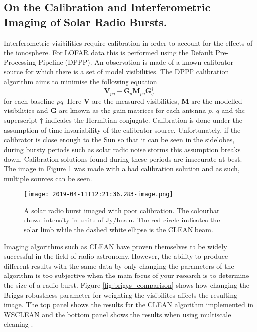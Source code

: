 \subsection{On the Calibration and Interferometric Imaging of Solar Radio Bursts.}
Interferometric visibilities require calibration in order to account for the effects of the ionosphere. For LOFAR data this is performed using the Default Pre-Processing Pipeline (DPPP). An observation is made of a known calibrator source for which there is a set of model visibilities. The DPPP calibration algorithm aims to minimise the following equation
\begin{equation}
\label{eq:gain}
\vert \vert \mathbf{V}_{pq} - \mathbf{G}_p \mathbf{M}_{pq} \mathbf{G}^\dag_q \vert \vert
\end{equation}
for each baseline $pq$. Here $\mathbf{V}$ are the measured visibilities, $\mathbf{M}$ are the modelled visibilities and $\mathbf{G}$ are known as the gain matrices for each antenna $p$, $q$ and the superscript $\dag$ indicates the Hermitian conjugate. Calibration is done under the assumption of time invariability of the calibrator source. Unfortunately, if the calibrator is close enough to the Sun so that it can be seen in the sidelobes, during bursty periods such as solar radio noise storms this assumption breaks down. Calibration solutions found during these periods are inaccurate at best. The image in Figure \ref{fig:bad_cal} was made with a bad calibration solution and as such, multiple sources can be seen.

\begin{figure}[ht]
\centering
\texttt{[image: 2019-04-11T12:21:36.283-image.png]}
\caption[An example of a solar radio burst imaged with poor calibration.]{A solar radio burst imaged with poor calibration. The colourbar shows intensity in units of Jy/beam. The red circle indicates the solar limb while the dashed white ellipse is the CLEAN beam.}
\label{fig:bad_cal}
\end{figure}

Imaging algorithms such as CLEAN have proven themselves to be widely successful in the field of radio astronomy. However, the ability to produce different results with the same data by only changing the parameters of the algorithm is too subjective when the main focus of your research is to determine the size of a radio burst. Figure \ref{fig:briggs_comparison} shows how changing the Briggs robustness parameter for weighting the visibilites \citep{Briggs1995} affects the resulting image. The top panel shows the results for the CLEAN algorithm implemented in WSCLEAN and the bottom panel shows the results when using multiscale cleaning \citep{Offringa2017}. 

